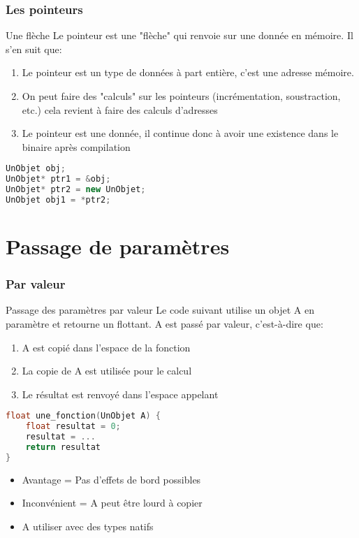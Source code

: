 \documentclass{beamer}
\begin{document}
\begin{frame}[fragile=singleslide,shrink=20]
\frametitle {Les pointeurs}

\begin{block}{Une flèche}
Le pointeur est une "flèche" qui renvoie sur une donnée en mémoire. Il s'en suit que:
\begin{enumerate}
\item Le pointeur est un type de données à part entière, c'est une adresse mémoire.
\item On peut faire des "calculs" sur les pointeurs (incrémentation, soustraction, etc.) cela revient à faire des calculs d'adresses
\item Le pointeur est une donnée, il continue donc à avoir une existence dans le binaire après compilation
\end{enumerate}
\end{block}

\begin{lstlisting}[language=c++]
UnObjet obj;
UnObjet* ptr1 = &obj;
UnObjet* ptr2 = new UnObjet;
UnObjet obj1 = *ptr2;
\end{lstlisting}
\end{frame}

\section{Passage de paramètres}

\begin{frame}[fragile=singleslide,shrink=20]
\frametitle {Par valeur}

\begin{block}{Passage des paramètres par valeur}
Le code suivant utilise un objet A en paramètre et retourne un flottant. A est passé par valeur, c'est-à-dire que:
\begin{enumerate}
\item A est copié dans l'espace de la fonction
\item La copie de A est utilisée pour le calcul
\item Le résultat est renvoyé dans l'espace appelant
\end{enumerate}
\end{block}

\begin{lstlisting}[language=c++]
float une_fonction(UnObjet A) {
    float resultat = 0;
    resultat = ...
    return resultat
}
\end{lstlisting}

\begin{block}{}
\begin{itemize}
\item Avantage = Pas d'effets de bord possibles
\item Inconvénient = A peut être lourd à copier
\item A utiliser avec des types natifs
\end{itemize}
\end{block}
\end{frame}
\end{document}
